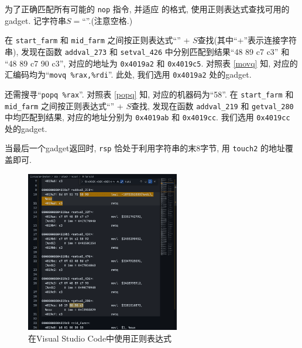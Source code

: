 为了正确匹配所有可能的 \verb|nop| 指令, 并适应  的格式, 使用正则表达式查找可用的gadget. 记字符串$S=$``''.(注意空格.)

在 \verb|start_farm| 和 \verb|mid_farm| 之间按正则表达式``'' + $S$查找(其中``+''表示连接字符串), 发现在函数 \verb|addval_273| 和 \verb|setval_426| 中分别匹配到结果``48 89 c7 c3'' 和 ``48 89 c7 90 c3'', 对应的地址为 \verb|0x4019a2| 和 \verb|0x4019c5|. 对照表 \ref{movq} 知, 对应的汇编码均为``\verb|movq %rax,%rdi|''. 此处, 我们选用 \verb|0x4019a2| 处的gadget.

还需搜寻``\verb|popq %rax|''. 对照表 \ref{popq} 知, 对应的机器码为``58''. 在 \verb|start_farm| 和 \verb|mid_farm| 之间按正则表达式``'' + $S$查找, 发现在函数 \verb|addval_219| 和 \verb|getval_280| 中均匹配到结果, 对应的地址分别为 \verb|0x4019ab| 和 \verb|0x4019cc|. 我们选用 \verb|0x4019cc| 处的gadget.

当最后一个gadget返回时, \verb|rsp| 恰处于利用字符串的末8字节, 用 \verb|touch2| 的地址覆盖即可.

\begin{figure}[H]
    \centering
    \includegraphics[width=0.6\textwidth]{regexp.png}
    \caption{在Visual Studio Code中使用正则表达式}
\end{figure}


